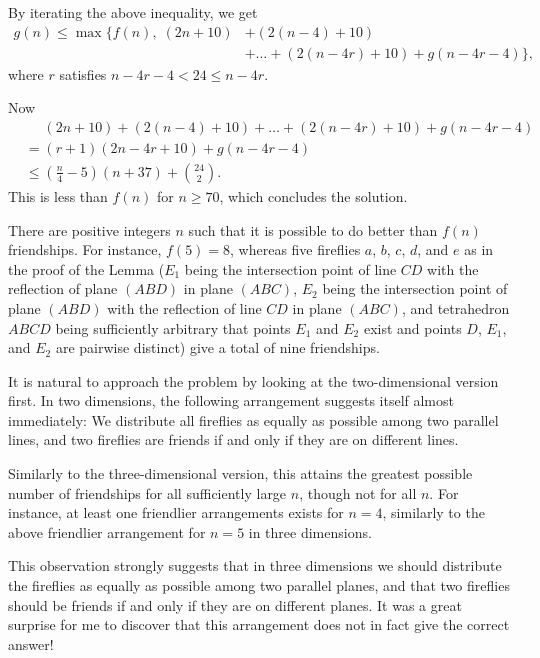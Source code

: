 \documentclass[11pt]{scrartcl}
\begin{document}
By iterating the above inequality, we get
\begin{align*}
  g(n) \le \max\Big\{f(n), \; (2n+10) &+ (2(n-4)+10) \\
  &+ \dots + (2(n-4r)+10) + g(n-4r-4)\Big\},
\end{align*}
where $r$ satisfies $n-4r-4 < 24 \le n-4r$.

Now
\begin{align*}
  & \phantom{{} = {}}
  (2n+10) + (2(n-4)+10) + \dots + (2(n-4r)+10) + g(n-4r-4)\\
  & = (r+1) (2n-4r+10) + g(n-4r-4)\\
  & \le \left(\frac n4 - 5\right)(n+37) + \binom{24}2.
\end{align*}
This is less than $f(n)$ for $n \ge 70$,
which concludes the solution.

\begin{remark*}
  There are positive integers $n$ such that it is possible to do better than $f(n)$ friendships. For instance, $f(5) = 8$, whereas five fireflies $a$, $b$, $c$, $d$, and $e$ as in the proof of the Lemma ($E_1$ being the intersection point of line $CD$ with the reflection of plane $(ABD)$ in plane $(ABC)$, $E_2$ being the intersection point of plane $(ABD)$ with the reflection of line $CD$ in plane $(ABC)$, and tetrahedron $ABCD$ being sufficiently arbitrary that points $E_1$ and $E_2$ exist and points $D$, $E_1$, and $E_2$ are pairwise distinct) give a total of nine friendships.
\end{remark*}

\begin{remark*}
  It is natural to approach the problem by looking at the two-dimensional version first. In two dimensions, the following arrangement suggests itself almost immediately: We distribute all fireflies as equally as possible among two parallel lines, and two fireflies are friends if and only if they are on different lines.

  Similarly to the three-dimensional version, this attains the greatest possible number of friendships for all sufficiently large $n$, though not for all $n$. For instance, at least one friendlier arrangements exists for $n = 4$, similarly to the above friendlier arrangement for $n = 5$ in three dimensions.

  This observation strongly suggests that in three dimensions we should distribute the fireflies as equally as possible among two parallel planes, and that two fireflies should be friends if and only if they are on different planes. It was a great surprise for me to discover that this arrangement does not in fact give the correct answer!
\end{remark*}
\end{document}
